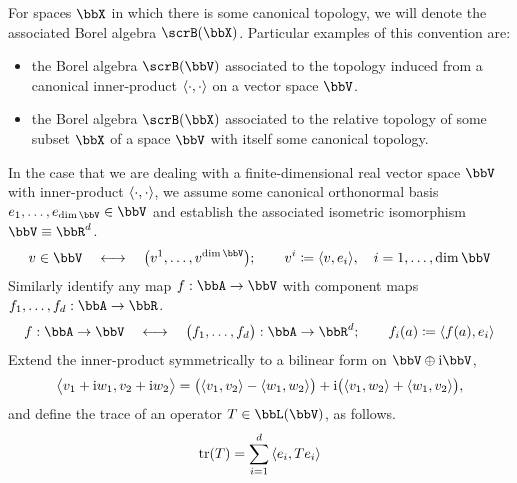 For spaces $\stateSpace$ in which there is some canonical topology, we will denote the associated Borel algebra $\scrB(\stateSpace)$.
Particular examples of this convention are:
\begin{itemize}
  \item
    the Borel algebra $\scrB(\vecSpace)$ associated to the topology induced from a canonical inner-product ${\langle \cdot , \cdot \rangle}$ on a vector space $\vecSpace$.
  \item
    the Borel algebra $\scrB(\stateSpace)$ associated to the relative topology of some subset $\stateSpace$ of a space $\vecSpace$ with itself some canonical topology.
\end{itemize}
In the case that we are dealing with a finite-dimensional real vector space $\vecSpace$ with inner-product ${\langle \cdot , \cdot \rangle}$, we assume some canonical orthonormal basis $\basisVec_1, \ldots, \basisVec_{\operatorname{dim}\vecSpace} \in \vecSpace$ and establish the associated isometric isomorphism $\vecSpace \equiv \bbR^d$.
\begin{equation*}
  \vecVar \in \vecSpace \quad\longleftrightarrow\quad \big(\vecVar^1, \ldots, \vecVar^{\operatorname{dim}\vecSpace}\big); \qquad \vecVar^i \defeq \prj{\vecVar}{\basisVec_i}, \quad i = 1, \ldots, \operatorname{dim}\vecSpace
\end{equation*}
Similarly identify any map $f: \bbA \rightarrow \vecSpace$ with component maps $f_1, \ldots, f_d: \bbA \rightarrow \bbR$.
\begin{equation*}
  f: \bbA \rightarrow \vecSpace \quad\longleftrightarrow\quad \big(f_1,\ldots, f_d\big): \bbA \rightarrow \bbR^d; \qquad f_i(a) \defeq \prj{f(a)}{\basisVec_i}
\end{equation*}
Extend the inner-product symmetrically to a bilinear form on $\vecSpace\oplus\im\vecSpace$,
\begin{equation*}
  {\big\langle v_1+{\rm i}w_1 , v_2 + {\rm i}w_2 \big\rangle} = \big({\langle v_1 , v_2 \rangle} - {\langle w_1 , w_2 \rangle}\big) + {\rm i}\big({\langle v_1 , w_2 \rangle} + {\langle w_1 , v_2 \rangle}\big),
\end{equation*}
and define the trace of an operator $T \in \bbL(\vecSpace)$, as follows.
\begin{equation*}
  \operatorname{tr}(T) = \sum_{i=1}^d {\langle e_i , Te_i \rangle}
\end{equation*}

